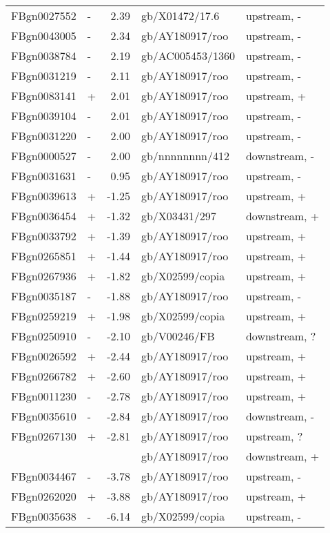 {\begin{longtable}{llrll}
    FBgn0027552 &   -   &   2.39    &    gb/X01472/17.6     &   upstream, -     \\
    FBgn0043005 &   -   &   2.34    &    gb/AY180917/roo    &   upstream, -     \\
    FBgn0038784 &   -   &   2.19    &    gb/AC005453/1360   &   upstream, -     \\
    FBgn0031219 &   -   &   2.11    &    gb/AY180917/roo    &   upstream, -     \\
    FBgn0083141 &   +   &   2.01    &    gb/AY180917/roo    &   upstream, +     \\
    FBgn0039104 &   -   &   2.01    &    gb/AY180917/roo    &   upstream, -     \\
    FBgn0031220 &   -   &   2.00    &    gb/AY180917/roo    &   upstream, -     \\
    FBgn0000527 &   -   &   2.00    &    gb/nnnnnnnn/412    &   downstream, -   \\
    FBgn0031631 &   -   &   0.95    &    gb/AY180917/roo    &   upstream, -     \\
    FBgn0039613 &   +   &   -1.25   &    gb/AY180917/roo    &   upstream, +     \\
    FBgn0036454 &   +   &   -1.32   &    gb/X03431/297      &   downstream, +   \\
    FBgn0033792 &   +   &   -1.39   &    gb/AY180917/roo    &   upstream, +     \\
    FBgn0265851 &   +   &   -1.44   &    gb/AY180917/roo    &   upstream, +     \\
    FBgn0267936 &   +   &   -1.82   &    gb/X02599/copia    &   upstream, +     \\
    FBgn0035187 &   -   &   -1.88   &    gb/AY180917/roo    &   upstream, -     \\
    FBgn0259219 &   +   &   -1.98   &    gb/X02599/copia    &   upstream, +     \\
    FBgn0250910 &   -   &   -2.10   &    gb/V00246/FB       &   downstream, ?   \\
    FBgn0026592 &   +   &   -2.44   &    gb/AY180917/roo    &   upstream, +     \\
    FBgn0266782 &   +   &   -2.60   &    gb/AY180917/roo    &   upstream, +     \\
    FBgn0011230 &   -   &   -2.78   &    gb/AY180917/roo    &   upstream, +     \\
    FBgn0035610 &   -   &   -2.84   &    gb/AY180917/roo    &   downstream, -   \\
    FBgn0267130 &   +   &   -2.81   &    gb/AY180917/roo    &   upstream, ?     \\
                &       &           &    gb/AY180917/roo    &   downstream, +   \\
    FBgn0034467 &   -   &   -3.78   &    gb/AY180917/roo    &   upstream, -     \\
    FBgn0262020 &   +   &   -3.88   &    gb/AY180917/roo    &   upstream, +     \\
    FBgn0035638 &   -   &   -6.14   &    gb/X02599/copia    &   upstream, -     \\
    \bottomrule
\end{longtable}
}



